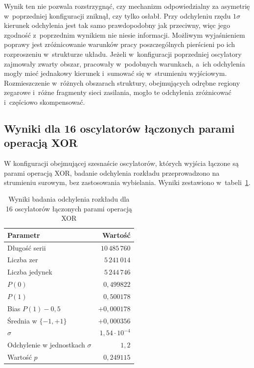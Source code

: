 Wynik ten nie pozwala rozstrzygnąć, czy mechanizm odpowiedzialny za asymetrię
w~poprzedniej konfiguracji zniknął, czy tylko osłabł. Przy odchyleniu rzędu
$1\sigma$ kierunek odchylenia jest tak samo prawdopodobny jak przeciwny, więc jego
zgodność z~poprzednim wynikiem nie niesie informacji. Możliwym wyjaśnieniem
poprawy jest zróżnicowanie warunków pracy poszczególnych pierścieni po ich
rozproszeniu w~strukturze układu. Jeżeli w~konfiguracji poprzedniej oscylatory
zajmowały zwarty obszar, pracowały w~podobnych warunkach, a~ich odchylenia mogły
mieć jednakowy kierunek i~sumować się w~strumieniu wyjściowym. Rozmieszczenie
w~różnych obszarach struktury, obejmujących odrębne regiony zegarowe i~różne
fragmenty sieci zasilania, mogło te odchylenia zróżnicować i~częściowo
skompensować.

\FloatBarrier

\subsection{Wyniki dla 16 oscylatorów łączonych parami operacją XOR}

W konfiguracji obejmującej szesnaście oscylatorów, których wyjścia łączone są
parami operacją XOR, badanie odchylenia rozkładu przeprowadzono na strumieniu
surowym, bez zastosowania wybielania. Wyniki zestawiono w~tabeli~\ref{tab:bias_ro16_xor}.

\begin{table}[H]
    \centering
    \caption{Wyniki badania odchylenia rozkładu dla 16 oscylatorów łączonych parami
    operacją XOR}
    \label{tab:bias_ro16_xor}
    \small
    \begin{tabular}{lr}
        \toprule
        Parametr & Wartość \\
        \midrule
        Długość serii            & $10\,485\,760$ \\
        Liczba zer               & $5\,241\,014$ \\
        Liczba jedynek           & $5\,244\,746$ \\
        $P(0)$                   & $0{,}499822$ \\
        $P(1)$                   & $0{,}500178$ \\
        Bias $P(1)-0{,}5$        & $+0{,}000178$ \\
        Średnia w $\{-1,+1\}$    & $+0{,}000356$ \\
        $\sigma$                 & $1{,}54 \cdot 10^{-4}$ \\
        Odchylenie w jednostkach $\sigma$ & $1{,}2$ \\
        Wartość $p$              & $0{,}249115$ \\
        \bottomrule
    \end{tabular}
\end{table}

